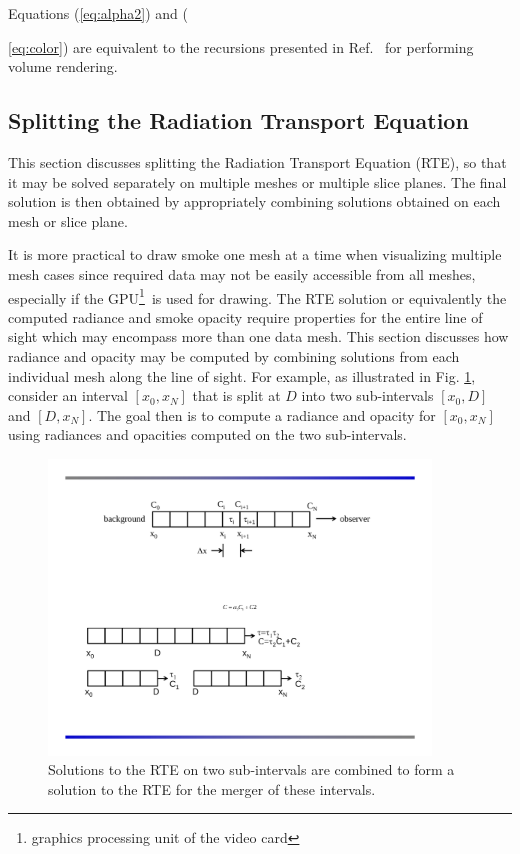 Equations (\ref{eq:alpha2}) and ({\ref{eq:color}) are equivalent
to the recursions presented in Ref.~\cite[Chapter 39]{gpugems} for
performing volume rendering.


\subsection{Splitting the Radiation Transport Equation}
This section discusses splitting the Radiation Transport
Equation (RTE), so that it may be solved separately on multiple
meshes or multiple slice planes.  The final solution is then
obtained by  appropriately combining solutions obtained on each
mesh or slice plane.

It is more practical to draw smoke one mesh at a time when
visualizing multiple mesh cases since required data may not be
easily accessible from all meshes, especially if the
GPU\footnote{graphics processing unit of the video card}\ is used
for drawing.  The RTE solution or equivalently the computed
radiance and smoke opacity require  properties for the entire line
of sight which may encompass more than one data mesh.  This
section discusses how  radiance and opacity may be computed by
combining solutions from each individual mesh along the line of
sight.  For example, as illustrated in Fig. \ref{figsmokesetup3},
consider an interval $[x_0,x_N]$ that is split at $D$ into two
sub-intervals $[x_0,D]$ and $[D,x_N]$.  The goal then is to
compute a radiance and opacity for $[x_0,x_N]$ using radiances and
opacities computed on  the two sub-intervals.

\begin{figure}[\figoptions]
\begin{center}
\includegraphics[width=4.0in]{FIGURES/smoke_setup3}
\end{center}
\caption {Solutions to the RTE on two sub-intervals are combined
to form a solution to the RTE for the merger of these intervals.}
\label{figsmokesetup3}
\end{figure}

}
